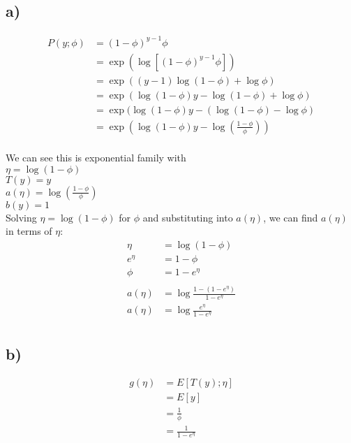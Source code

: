 \documentclass[11pt]{article}
\begin{document}
\subsection*{a)}

\begin{align*}
    P(y;\phi) &= (1-\phi)^{y-1} \phi \\
              &= \exp(\log[(1-\phi)^{y-1} \phi]) \\
              &= \exp ( (y-1) \log(1-\phi) + \log\phi ) \\
              &= \exp ( \log(1-\phi) y - \log(1-\phi) + \log \phi ) \\
              &= \exp ( \log(1-\phi) y - (\log(1-\phi) - \log \phi ) \\
              &= \exp ( \log(1-\phi) y - \log(\frac{1-\phi}{\phi}) ) \\
\end{align*}

We can see this is exponential family with \\
$\eta = \log(1-\phi)$ \\
$T(y) = y$ \\
$a(\eta) = \log(\frac{1-\phi}{\phi})$ \\
$b(y) = 1$ \\

Solving $\eta = \log(1-\phi)$ for $\phi$ and substituting into $a(\eta)$, we can find $a(\eta)$ in terms of $\eta$:
\begin{align*}
    \eta       &= \log(1-\phi) \\
    e^{\eta}   &= 1-\phi \\
    \phi       &= 1 - e^{\eta} \\
    \\
    a(\eta) &= \log \frac{1-(1-e^\eta)}{1-e^\eta} \\
    a(\eta) &= \log \frac{e^\eta}{1-e^\eta} \\
\end{align*}

\subsection*{b)}

\begin{align*}
    g(\eta) &= E[T(y);\eta] \\
            &= E[y] \\
            &= \frac{1}{\phi} \\
            &= \frac{1}{1-e^\eta} \\
\end{align*}
\end{document}
